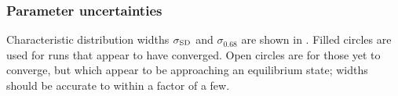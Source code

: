 \subsubsection{Parameter uncertainties}

Characteristic distribution widths $\sigma_\mathrm{SD}$ and $\sigma_{0.68}$ are shown in . Filled circles are used for runs that appear to have converged. Open circles are for those yet to converge, but which appear to be approaching an equilibrium state; widths should be accurate to within a factor of a few.
\begin{figure}%
\begin{center}
 \quad
{} \\
 \quad

\end{center}
\end{figure}
